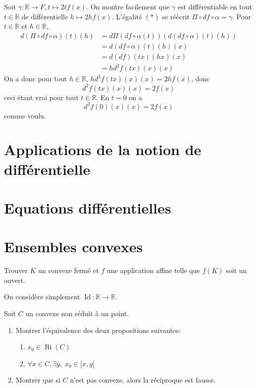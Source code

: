 \documentclass{fancybook}
\DeclareMathOperator{\Id}{Id}
\DeclareMathOperator{\Ri}{Ri}
\begin{document}
Soit $\gamma: \mathbb R\to F, t\mapsto 2tf(x)$. On montre facilement que $\gamma$ est différentiable en tout $t\in \mathbb R$ de différentielle $h\mapsto 2hf(x)$.\newline
L'égalité $(*)$ se réécrit $\Pi\circ df \circ \alpha = \gamma$. Pour $t\in \mathbb R$ et $h\in \mathbb R$, $$\begin{aligned}
d(\Pi\circ df \circ \alpha)(t)(h) &= d\Pi(df\circ \alpha(t))(d(df\circ \alpha)(t)(h)) \\
&= d(df\circ \alpha)(t)(h)(x)\\
&= d(df)(tx)(hx)(x)\\
&= hd^2f(tx)(x)(x)
\end{aligned}$$
On a donc pour tout $h\in \mathbb R$, $hd^2f(tx)(x)(x) = 2hf(x)$, donc $$d^2f(tx)(x)(x) = 2f(x)$$ ceci étant vrai pour tout $t\in \mathbb R$.
En $t=0$ on a $$d^2f(0)(x)(x) = 2f(x)$$ comme voulu.

\section{Applications de la notion de différentielle}

\section{Equations différentielles}

\section{Ensembles convexes}

\begin{exercice}
Trouver $K$ un convexe fermé et $f$ une application affine telle que $f(K)$ soit un ouvert.
\end{exercice}
On considère simplement $\Id:\mathbb R \to \mathbb R$.

\begin{exercice}
Soit $C$ un convexe non réduit à un point.
\begin{enumerate}
\item Montrer l'équivalence des deux propositions suivantes:
\begin{enumerate}
\item $x_0 \in \Ri(C)$
\item $\forall x\in C, \exists y,\; x_0\in [x,y[$
\end{enumerate}
\item Montrer que si $C$ n'est pas convexe, alors la réciproque est fausse.
\end{enumerate}
\end{exercice}
\end{document}
